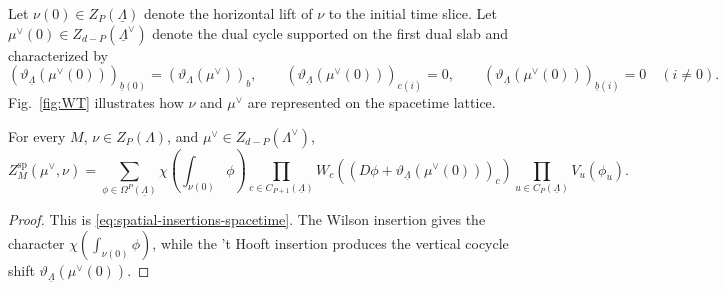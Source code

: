 Let \(\nu(0)\in Z_P(\underline\Lambda)\) denote the horizontal lift of \(\nu\) to the
initial time slice. Let \(\mu^\vee(0)\in Z_{d-P}(\underline\Lambda^\vee)\) denote the dual
cycle supported on the first dual slab and characterized by
\begin{equation}
	\left(\vartheta_{\underline\Lambda}(\mu^\vee(0))\right)_{\underline b(0)}
	=
	(\vartheta_\Lambda(\mu^\vee))_b,
	\qquad
	\left(\vartheta_{\underline\Lambda}(\mu^\vee(0))\right)_{c(i)}=0,
	\qquad
	\left(\vartheta_{\underline\Lambda}(\mu^\vee(0))\right)_{\underline b(i)}=0
	\quad(i\neq0).
	\label{eq:eta-mu0}
\end{equation}
Fig.~\ref{fig:WT} illustrates how $\nu$ and $\mu^\vee$ are represented on the spacetime lattice.

\begin{prop}
	\label{prop:spatially-decorated-spacetime}
	For every \(M\), \(\nu\in Z_P(\Lambda)\), and
	\(\mu^\vee\in Z_{d-P}(\Lambda^\vee)\),
	\begin{equation}
		Z_M^{\mathrm{sp}}(\mu^\vee,\nu)
		=
		\sum_{\phi\in\Omega^P(\underline\Lambda)}
		\chi\left(\int_{\nu(0)}\phi\right)
		\prod_{c\in C_{P+1}(\underline\Lambda)}
		W_c\left((D\phi+\vartheta_{\underline\Lambda}(\mu^\vee(0)))_c\right)
		\prod_{u\in C_P(\underline\Lambda)}
		V_u(\phi_u).
		\label{eq:Zsp}
	\end{equation}
\end{prop}

\begin{proof}
	This is \eqref{eq:spatial-insertions-spacetime}. The Wilson insertion gives the character
	\(\chi(\int_{\nu(0)}\phi)\), while the 't Hooft insertion produces the vertical
	cocycle shift \(\vartheta_{\underline\Lambda}(\mu^\vee(0))\).
\end{proof}

